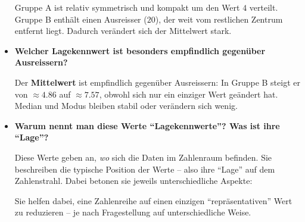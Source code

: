 \begin{aufgabe}{1}
\begin{itemize}
  Gruppe A ist relativ symmetrisch und kompakt um den Wert $4$ verteilt. Gruppe B enthält einen Ausreisser ($20$), der weit vom restlichen Zentrum entfernt liegt. Dadurch verändert sich der Mittelwert stark.

  \item \textbf{Welcher Lagekennwert ist besonders empfindlich gegenüber Ausreissern?}

  Der \textbf{Mittelwert} ist empfindlich gegenüber Ausreissern: In Gruppe B steigt er von $\approx 4.86$ auf $\approx 7.57$, obwohl sich nur ein einziger Wert geändert hat. Median und Modus bleiben stabil oder verändern sich wenig.

  \item \textbf{Warum nennt man diese Werte ``Lagekennwerte''? Was ist ihre ``Lage''?}

  Diese Werte geben an, \emph{wo} sich die Daten im Zahlenraum befinden. Sie beschreiben die typische Position der Werte – also ihre ``Lage'' auf dem Zahlenstrahl. Dabei betonen sie jeweils unterschiedliche Aspekte:

  Sie helfen dabei, eine Zahlenreihe auf einen einzigen ``repräsentativen'' Wert zu reduzieren – je nach Fragestellung auf unterschiedliche Weise.
\end{itemize}
\end{aufgabe}

